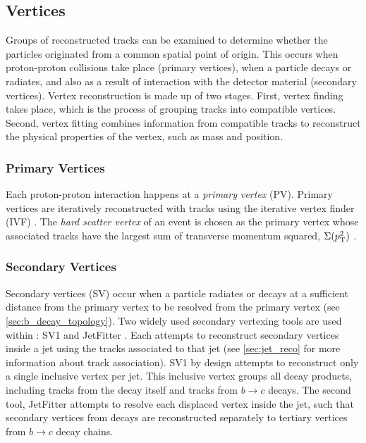 \subsection{Vertices}\label{sec:vertex_reco}
Groups of reconstructed tracks can be examined to determine whether the particles originated from a common spatial point of origin.
This occurs when proton-proton collisions take place (primary vertices), when a particle decays or radiates, and also as a result of interaction with the detector material (secondary vertices).
Vertex reconstruction is made up of two stages.
First, vertex finding takes place, which is the process of grouping tracks into compatible vertices.
Second, vertex fitting combines information from compatible tracks to reconstruct the physical properties of the vertex, such as mass and position.

\subsubsection{Primary Vertices}
Each proton-proton interaction happens at a \textit{primary vertex} (PV).
Primary vertices are iteratively reconstructed with tracks using the iterative vertex finder (IVF) \cite{PERF-2015-01}.
The \textit{hard scatter vertex} of an event is chosen as the primary vertex whose associated tracks have the largest sum of transverse momentum squared, $\Sigma(p_{\text{T}}^2)$ \cite{ATL-PHYS-PUB-2015-026}.

\subsubsection{Secondary Vertices}
Secondary vertices (SV) occur when a particle radiates or decays at a sufficient distance from the primary vertex to be resolved from the primary vertex (see \cref{sec:b_decay_topology}).
Two widely used secondary vertexing tools are used within \ATLAS: SV1 and JetFitter \cite{FTAG-2018-01,ATL-PHYS-PUB-2017-011}.
Each attempts to reconstruct secondary vertices inside a jet using the tracks associated to that jet (see \cref{sec:jet_reco} for more information about track association).
SV1 by design attempts to reconstruct only a single inclusive vertex per jet.
This inclusive vertex groups all \bhadron decay products, including tracks from the \bhadron decay itself and tracks from $b \rightarrow c$ decays.
The second tool, JetFitter attempts to resolve each displaced vertex inside the jet, such that secondary vertices from \bhadron decays are reconstructed separately to tertiary vertices from $b \rightarrow c$ decay chains.


